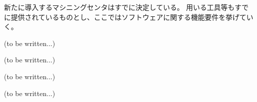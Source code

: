 

新たに導入するマシニングセンタはすでに決定している。
用いる工具等もすでに提供されているものとし、ここではソフトウェアに関する機能要件を挙げていく。



(to be written...)



(to be written...)



(to be written...)



(to be written...)




